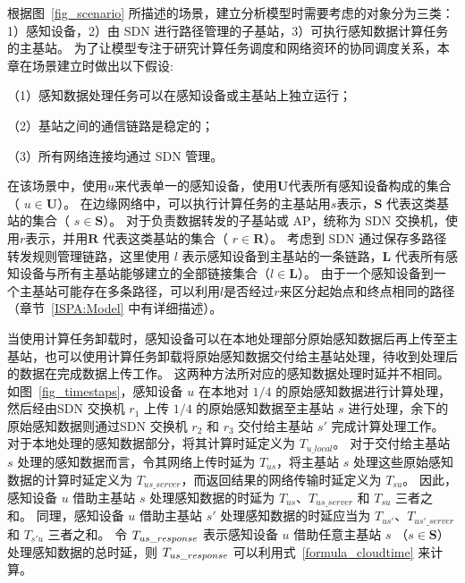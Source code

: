 根据图~\ref{fig_scenario} 所描述的场景，建立分析模型时需要考虑的对象分为三类：
1）感知设备，2）由 SDN 进行路径管理的子基站，3）可执行感知数据计算任务的主基站。
为了让模型专注于研究计算任务调度和网络资环的协同调度关系，本章在场景建立时做出以下假设: 

（1）感知数据处理任务可以在感知设备或主基站上独立运行；

（2）基站之间的通信链路是稳定的；

（3）所有网络连接均通过 SDN 管理。



在该场景中，使用$u$来代表单一的感知设备，使用$\boldsymbol{U}$代表所有感知设备构成的集合（ $ u \in \boldsymbol{U} $）。
在边缘网络中，可以执行计算任务的主基站用$s$表示，$\boldsymbol{S}$ 代表这类基站的集合（ $ s \in \boldsymbol{S} $）。
对于负责数据转发的子基站或 AP，统称为 SDN 交换机，使用$r$表示，并用$\boldsymbol{R}$ 代表这类基站的集合（ $ r \in \boldsymbol{R} $）。
考虑到 SDN 通过保存多路径转发规则管理链路，这里使用 $l$ 表示感知设备到主基站的一条链路，$ \boldsymbol{L}$ 代表所有感知设备与所有主基站能够建立的全部链接集合（$l \in \boldsymbol{L} $）。
由于一个感知设备到一个主基站可能存在多条路径，可以利用$l$是否经过$r$来区分起始点和终点相同的路径（章节~\ref{ISPA:Model} 中有详细描述）。

当使用计算任务卸载时，感知设备可以在本地处理部分原始感知数据后再上传至主基站，也可以使用计算任务卸载将原始感知数据交付给主基站处理，待收到处理后的数据在完成数据上传工作。
这两种方法所对应的感知数据处理时延并不相同。
如图~\ref{fig_timestaps}，感知设备 $u$ 在本地对 $1/4$ 的原始感知数据进行计算处理，
然后经由SDN 交换机 $r_1$ 上传 $1/4$ 的原始感知数据至主基站 $s$ 进行处理，余下的原始感知数据则通过SDN 交换机 $r_2$ 和 $r_3$ 交付给主基站 $s'$ 完成计算处理工作。
对于本地处理的感知数据部分，将其计算时延定义为 $T_{u\_local}$。
对于交付给主基站 $s$ 处理的感知数据而言，令其网络上传时延为 $T_{us}$，将主基站 $s$ 处理这些原始感知数据的计算时延定义为 $T_{us\_server}$，而返回结果的网络传输时延定义为 $T_{su}$。
因此，感知设备 $u$ 借助主基站 $s$ 处理感知数据的时延为 $T_{us}$、$T_{us\_server}$ 和 $T_{su}$ 三者之和。
同理，感知设备 $u$ 借助主基站 $s'$ 处理感知数据的时延应当为 $T_{us'}$、$T_{us'\_server}$ 和 $T_{s'u}$ 三者之和。
令 ${T}_{us\_response}$ 表示感知设备 $u$ 借助任意主基站 $s$ （$s \in \boldsymbol{S}$）处理感知数据的总时延，则 ${T}_{us\_response}$ 可以利用式~\eqref{formula_cloudtime} 来计算。


